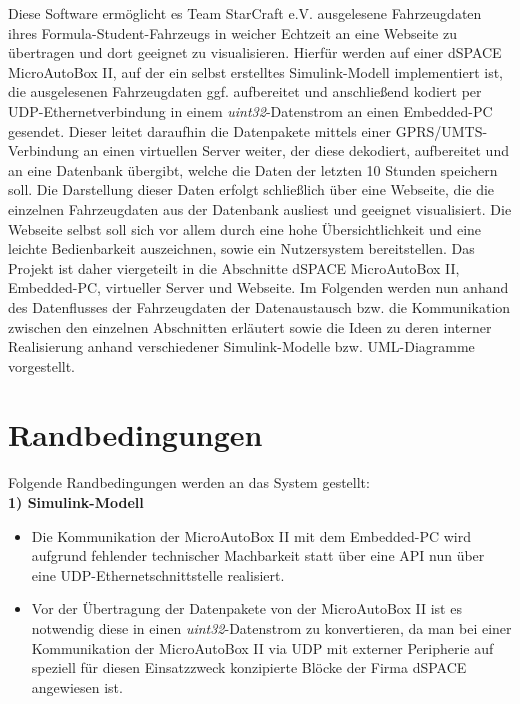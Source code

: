 \documentclass[fontsize = 12pt, paper = a4]{scrreprt}
\begin{document}
Diese Software ermöglicht es Team StarCraft e.V. ausgelesene Fahrzeugdaten ihres Formula-Student-Fahrzeugs in weicher Echtzeit an eine Webseite zu übertragen und dort geeignet zu visualisieren. Hierfür werden auf einer dSPACE MicroAutoBox II, auf der ein selbst erstelltes Simulink-Modell implementiert ist, die ausgelesenen Fahrzeugdaten ggf. auf\-be\-reitet und anschließend kodiert per UDP-Ethernetverbindung in einem \textit{uint32}-Datenstrom an einen Embedded-PC gesendet. Dieser leitet daraufhin die Datenpakete mittels einer GPRS/UMTS-Verbindung an einen virtuellen Server weiter, der diese dekodiert, aufbereitet und an eine Datenbank übergibt, welche die Daten der letzten 10 Stunden speichern soll. Die Darstellung dieser Daten erfolgt schließlich über eine Webseite, die die einzelnen Fahrzeugdaten aus der Datenbank ausliest und geeignet visualisiert. Die Webseite selbst soll sich vor allem durch eine hohe Übersichtlichkeit und eine leichte Bedienbarkeit auszeichnen, sowie ein Nutzersystem bereitstellen. Das Projekt ist daher viergeteilt in die Abschnitte dSPACE MicroAutoBox II, Embedded-PC, virtueller Server und Webseite. Im Folgenden werden nun anhand des Datenflusses der Fahrzeugdaten der Datenaustausch bzw. die Kommunikation zwischen den einzelnen Abschnitten erläutert sowie die Ideen zu deren interner Realisierung anhand verschiedener Simulink-Modelle bzw. UML-Diagramme vorgestellt.


\chapter{Randbedingungen} 

Folgende Randbedingungen werden an das System gestellt: \\

\textbf{1) Simulink-Modell} 

\begin{itemize}

\item Die Kommunikation der MicroAutoBox II mit dem Embedded-PC wird aufgrund fehlender technischer Machbarkeit statt über eine API nun über eine UDP-Ethernet\-schnittstelle realisiert.


\item Vor der Übertragung der Datenpakete von der MicroAutoBox II ist es notwendig diese in einen \textit{uint32}-Datenstrom zu konvertieren, da man bei einer Kommunikation der MicroAutoBox II via UDP mit externer Peripherie auf speziell für diesen Einsatzzweck konzipierte Blöcke der Firma dSPACE angewiesen ist. \\

\end{itemize}
\end{document}
